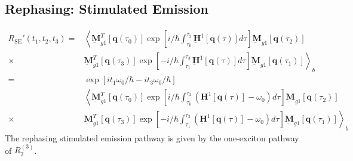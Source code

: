 \documentclass{article}
\newcommand{\bra}[1]{\ensuremath{\left\langle#1\right|}}
\newcommand{\ket}[1]{\ensuremath{\left|#1\right\rangle}}
\newcommand{\vect}[1]{\ensuremath{\boldsymbol{\mathbf{#1}}}}
\newcommand{\arw}{-{Latex[length=2mm]}}
\begin{document}
\subsection{Rephasing: Stimulated Emission }
\begin{figure}[h]
\centering
{}
\end{figure}
\begin{equation}
\begin{split}
 R_\mathrm{SE}'(t_{1},t_{2},t_{3})=&\left\langle\underbar{\vect{M}}_{g1}^{T}[\vect q(\tau_{0})]\exp\left[i/\hbar\int_{\tau_{0}}^{\tau_{2}}\underbar{\vect{H}}^{1}[\vect q(\tau)]d\tau\right] \underbar{\vect{M}}_{g1} [\vect q(\tau_{2})]\right.\\
 \times&\left.\underbar{\vect{M}}_{g1}^{T}[\vect q(\tau_{3})]\exp\left[-i/\hbar\int_{\tau_{1}}^{\tau_{3}}\underbar{\vect{H}}^{1}[\vect q(\tau)]d\tau\right] \underbar{\vect{M}}_{g1} [\vect q(\tau_{1})]\right\rangle_{b}\\
 =&\exp\left[i t_{1}\omega_{0}/\hbar-it_{3}\omega_{0}/\hbar\right]\\
 &\left\langle\underbar{\vect{M}}_{g1}^{T}[\vect q(\tau_{0})]\exp\left[i/\hbar\int_{\tau_{0}}^{\tau_{2}}\left(\underbar{\vect{H}}^{1}[\vect q(\tau)]-\omega_{0}\right)d\tau\right] \underbar{\vect{M}}_{g1} [\vect q(\tau_{2})]\right.\\
 \times&\left.\underbar{\vect{M}}_{g1}^{T}[\vect q(\tau_{3})]\exp\left[-i/\hbar\int_{\tau_{1}}^{\tau_{3}}\left(\underbar{\vect{H}}^{1}[\vect q(\tau)]-\omega_{0}\right)d\tau\right] \underbar{\vect{M}}_{g1} [\vect q(\tau_{1})]\right\rangle_{b}
\end{split}
\end{equation}
The rephasing stimulated emission pathway is given by the one-exciton pathway of $R_{2}^{(3)}$.

\clearpage
\end{document}
